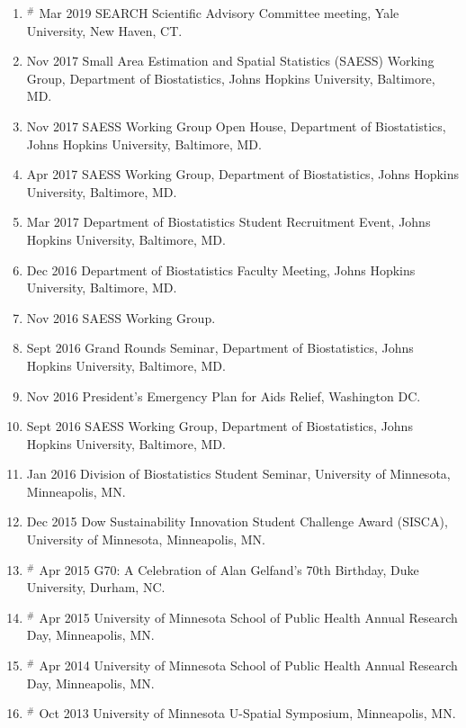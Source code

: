 \documentclass[10pt]{article}
\newcommand{\mycon}[1]{\smallskip\begin{enumerate}[resume,label={\scriptsize \arabic*$\ $},leftmargin=\parindent]\setlength{\itemsep}{#1}\vspace*{-0.7em}}
\newcommand{\ee}{\end{enumerate}}
\begin{document}
\mycon{0.3em}
\item $^\#$ Mar 2019 SEARCH Scientific Advisory Committee meeting, Yale University, New Haven, CT. 
\item Nov 2017 Small Area Estimation
and Spatial Statistics (SAESS) Working Group, Department of Biostatistics, Johns Hopkins University, Baltimore, MD. 
\item Nov 2017 SAESS Working Group Open House, Department of Biostatistics, Johns Hopkins University, Baltimore, MD.
\item Apr 2017 SAESS Working Group, Department of Biostatistics, Johns Hopkins University, Baltimore, MD.
\item Mar 2017 Department of Biostatistics Student Recruitment Event, Johns Hopkins University, Baltimore, MD.
\item Dec 2016 Department of Biostatistics Faculty Meeting, Johns Hopkins University, Baltimore, MD.
\item Nov 2016 SAESS Working Group.
\item Sept 2016 Grand Rounds Seminar, Department of Biostatistics, Johns Hopkins University, Baltimore, MD.
\item Nov 2016 President’s Emergency Plan for Aids Relief, Washington DC.
\item Sept 2016 SAESS Working Group, Department of Biostatistics, Johns Hopkins University, Baltimore, MD.
\item Jan 2016 Division of Biostatistics Student Seminar, University of Minnesota, Minneapolis,
MN.
\item Dec 2015 Dow Sustainability Innovation Student Challenge Award (SISCA), University of Minnesota, Minneapolis,
MN.
\item $^\#$ Apr 2015 G70: A Celebration of Alan Gelfand’s 70th Birthday, Duke University, Durham, NC.
\item $^\#$ Apr 2015 University of Minnesota School of Public Health Annual Research Day, Minneapolis,
MN.
\item $^\#$ Apr 2014 University of Minnesota School of Public Health Annual Research Day, Minneapolis,
MN.
\item $^\#$ Oct 2013 University of Minnesota U-Spatial Symposium, Minneapolis, MN.

\ee
\end{document}
